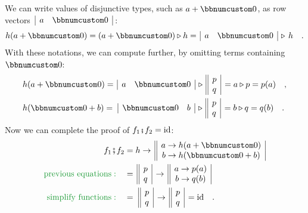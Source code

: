 We can write values of disjunctive types, such as $a+\bbnum 0$, as
row vectors $\,\begin{array}{|cc|}
a & \bbnum 0\end{array}\,$:
\begin{equation}
h(a+\bbnum 0)=(a+\bbnum 0)\triangleright h=\,\begin{array}{|cc|}
a & \bbnum 0\end{array}\,\triangleright\,h\quad.\label{eq:forward-notation-}
\end{equation}
With these notations, we can compute further, by omitting terms containing
$\bbnum 0$:
\begin{align*}
 & h(a+\bbnum 0)=\,\begin{array}{|cc|}
a & \bbnum 0\end{array}\,\triangleright\,\begin{array}{||c|}
p\\
q
\end{array}\,=a\triangleright p=p(a)\quad,\\
 & h(\bbnum 0+b)=\,\,\begin{array}{|cc|}
\bbnum 0 & b\end{array}\,\triangleright\,\begin{array}{||c|}
p\\
q
\end{array}\,=b\triangleright q=q(b)\quad.
\end{align*}
Now we can complete the proof of $f_{1}\bef f_{2}=\text{id}$:
\begin{align*}
f_{1}\bef f_{2} & =h\rightarrow\,\begin{array}{||c|}
a\rightarrow h(a+\bbnum 0)\\
b\rightarrow h(\bbnum 0+b)
\end{array}\\
{\color{greenunder}\text{previous equations}:}\quad & =\,\begin{array}{||c|}
p\\
q
\end{array}\,\rightarrow\,\begin{array}{||c|}
a\rightarrow p(a)\\
b\rightarrow q(b)
\end{array}\\
{\color{greenunder}\text{simplify functions}:}\quad & =\,\,\begin{array}{||c|}
p\\
q
\end{array}\,\rightarrow\,\begin{array}{||c|}
p\\
q
\end{array}\,=\text{id}\quad.
\end{align*}

